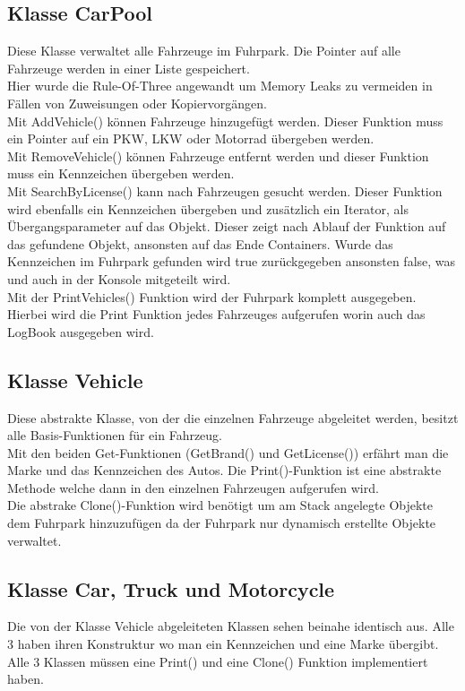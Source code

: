 \subsection{Klasse CarPool}
Diese Klasse verwaltet alle Fahrzeuge im Fuhrpark. Die Pointer auf alle Fahrzeuge werden in einer Liste gespeichert. \\
Hier wurde die Rule-Of-Three angewandt um Memory Leaks zu vermeiden in Fällen von Zuweisungen oder Kopiervorgängen.\\
Mit AddVehicle() können Fahrzeuge hinzugefügt werden. Dieser Funktion muss ein Pointer auf ein PKW, LKW oder Motorrad übergeben werden. \\
Mit RemoveVehicle() können Fahrzeuge entfernt werden und dieser Funktion muss ein Kennzeichen übergeben werden. \\
Mit SearchByLicense() kann nach Fahrzeugen gesucht werden. Dieser Funktion wird ebenfalls ein Kennzeichen übergeben und zusätzlich ein Iterator, als Übergangsparameter auf das Objekt. Dieser zeigt nach Ablauf der Funktion auf das gefundene Objekt, ansonsten auf das Ende Containers. Wurde das Kennzeichen im Fuhrpark gefunden wird true zurückgegeben ansonsten false, was und auch in der Konsole mitgeteilt wird. \\
Mit der PrintVehicles() Funktion wird der Fuhrpark komplett ausgegeben. Hierbei wird die Print Funktion jedes Fahrzeuges aufgerufen worin auch das LogBook ausgegeben wird.

\subsection{Klasse Vehicle}
Diese abstrakte Klasse, von der die einzelnen Fahrzeuge abgeleitet werden, besitzt alle Basis-Funktionen für ein Fahrzeug.\\
Mit den beiden Get-Funktionen (GetBrand() und GetLicense()) erfährt man die Marke und das Kennzeichen des Autos. Die Print()-Funktion ist eine abstrakte Methode welche dann in den einzelnen Fahrzeugen aufgerufen wird. \\
Die abstrake Clone()-Funktion wird benötigt um am Stack angelegte Objekte dem Fuhrpark hinzuzufügen da der Fuhrpark nur dynamisch erstellte Objekte verwaltet. 

\subsection{Klasse Car, Truck und Motorcycle}
Die von der Klasse Vehicle abgeleiteten Klassen sehen beinahe identisch aus. Alle 3 haben ihren Konstruktur wo man ein Kennzeichen und eine Marke übergibt.\\
Alle 3 Klassen müssen eine Print() und eine Clone() Funktion implementiert haben. 


